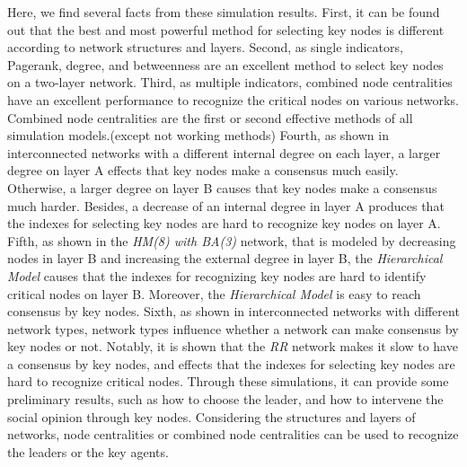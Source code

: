 Here, we find several facts from these simulation results. First, it can be found out that the best and most powerful method for selecting key nodes is different according to network structures and layers. Second, as single indicators, Pagerank, degree, and betweenness are an excellent method to select key nodes on a two-layer network. Third, as multiple indicators, combined node centralities have an excellent performance to recognize the critical nodes on various networks. Combined node centralities are the first or second effective methods of all simulation models.(except not working methods) Fourth, as shown in interconnected networks with a different internal degree on each layer, a larger degree on layer A effects that key nodes make a consensus much easily. Otherwise, a larger degree on layer B causes that key nodes make a consensus much harder. Besides, a decrease of an internal degree in layer A produces that the indexes for selecting key nodes are hard to recognize key nodes on layer A. Fifth, as shown in the \textit{HM(8) with BA(3)} network, that is modeled by decreasing nodes in layer B and increasing the external degree in layer B,  the \textit{Hierarchical Model} causes that the indexes for recognizing key nodes are hard to identify critical nodes on layer B.  Moreover, the \textit{Hierarchical Model} is easy to reach consensus by key nodes. Sixth, as shown in interconnected networks with different network types, network types influence whether a network can make consensus by key nodes or not. Notably, it is shown that the \textit{RR} network makes it slow to have a consensus by key nodes, and effects that the indexes for selecting key nodes are hard to recognize critical nodes. Through these simulations, it can provide some preliminary results, such as how to choose the leader, and how to intervene the social opinion through key nodes. Considering the structures and layers of networks, node centralities or combined node centralities can be used to recognize the leaders or the key agents.\\
